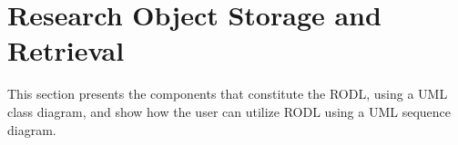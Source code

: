 \section{Research Object Storage and Retrieval}
This section presents the components that constitute the RODL, using a UML class diagram, and show how the user can utilize RODL using a UML sequence diagram.